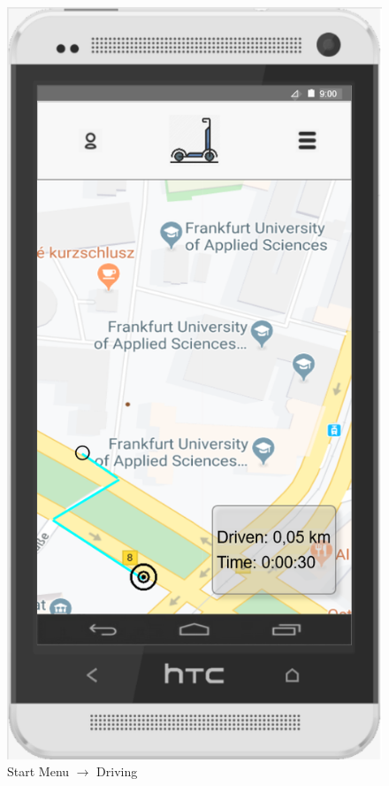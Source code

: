 \documentclass[a4paper, 12pt]{article}
\begin{document}
\begin{figure} [htbp]
  \begin{center}
    \includegraphics[scale=0.75]{images/prototypes/01-02-start-menu---driving.png}
  \end{center}
  \caption{Start Menu $\rightarrow$ Driving}
\end{figure}
\end{document}
